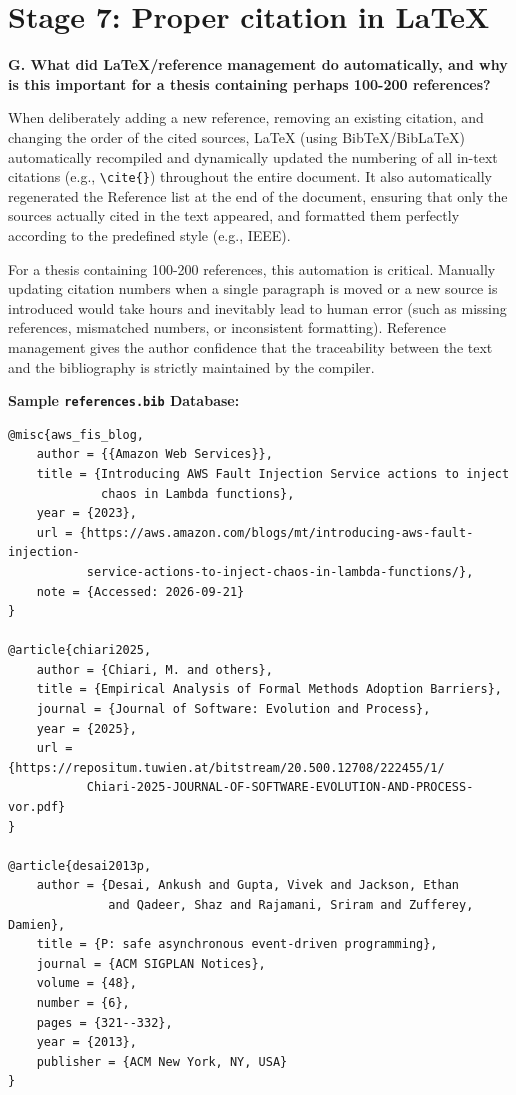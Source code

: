 \documentclass{article}
\begin{document}

\newpage
\section*{Stage 7: Proper citation in LaTeX}

\textbf{G. What did LaTeX/reference management do automatically, and why is this important for a thesis containing perhaps 100-200 references?}

When deliberately adding a new reference, removing an existing citation, and changing the order of the cited sources, LaTeX (using BibTeX/BibLaTeX) automatically recompiled and dynamically updated the numbering of all in-text citations (e.g., \verb|\cite{}|) throughout the entire document. It also automatically regenerated the Reference list at the end of the document, ensuring that only the sources actually cited in the text appeared, and formatted them perfectly according to the predefined style (e.g., IEEE).

For a thesis containing 100-200 references, this automation is critical. Manually updating citation numbers when a single paragraph is moved or a new source is introduced would take hours and inevitably lead to human error (such as missing references, mismatched numbers, or inconsistent formatting). Reference management gives the author confidence that the traceability between the text and the bibliography is strictly maintained by the compiler.

\vspace{1em}
\noindent\textbf{Sample \texttt{references.bib} Database:}

\begin{verbatim}
@misc{aws_fis_blog,
    author = {{Amazon Web Services}},
    title = {Introducing AWS Fault Injection Service actions to inject
             chaos in Lambda functions},
    year = {2023},
    url = {https://aws.amazon.com/blogs/mt/introducing-aws-fault-injection-
           service-actions-to-inject-chaos-in-lambda-functions/},
    note = {Accessed: 2026-09-21}
}

@article{chiari2025,
    author = {Chiari, M. and others},
    title = {Empirical Analysis of Formal Methods Adoption Barriers},
    journal = {Journal of Software: Evolution and Process},
    year = {2025},
    url = {https://repositum.tuwien.at/bitstream/20.500.12708/222455/1/
           Chiari-2025-JOURNAL-OF-SOFTWARE-EVOLUTION-AND-PROCESS-vor.pdf}
}

@article{desai2013p,
    author = {Desai, Ankush and Gupta, Vivek and Jackson, Ethan
              and Qadeer, Shaz and Rajamani, Sriram and Zufferey, Damien},
    title = {P: safe asynchronous event-driven programming},
    journal = {ACM SIGPLAN Notices},
    volume = {48},
    number = {6},
    pages = {321--332},
    year = {2013},
    publisher = {ACM New York, NY, USA}
}
\end{verbatim}
\end{document}

